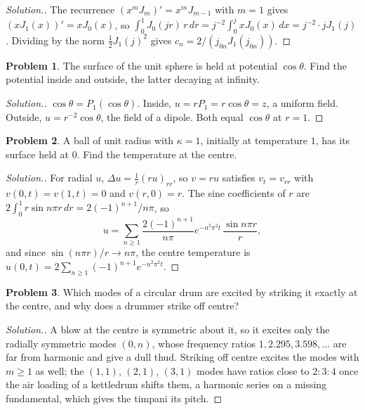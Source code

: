 \documentclass[11pt,a4paper]{article}
\numberwithin{equation}{section}
\theoremstyle{definition}
\newtheorem{problemx}{Problem}[subsection]
\newenvironment{problem}{\begin{problemx}}{\end{problemx}}
\newenvironment{solution}
  {\renewcommand{\qedsymbol}{}\begin{proof}[\textit{Solution}.]}
  {\end{proof}}
\begin{document}
\begin{solution}
The recurrence $(x^mJ_m)' = x^mJ_{m - 1}$ with $m = 1$ gives $(xJ_1(x))' = xJ_0(x)$, so $\int_0^1J_0(jr)\,r\,dr = j^{-2}\int_0^jxJ_0(x)\,dx = j^{-2}\cdot jJ_1(j)$. Dividing by the norm $\frac12J_1(j)^2$ gives $c_n = 2/(j_{0n}J_1(j_{0n}))$.
\end{solution}

\begin{problem}
The surface of the unit sphere is held at potential $\cos\theta$. Find the potential inside and outside, the latter decaying at infinity.
\end{problem}

\begin{solution}
$\cos\theta = P_1(\cos\theta)$. Inside, $u = rP_1 = r\cos\theta = z$, a uniform field. Outside, $u = r^{-2}\cos\theta$, the field of a dipole. Both equal $\cos\theta$ at $r = 1$.
\end{solution}

\begin{problem}
\label{prob:ball}
A ball of unit radius with $\kappa = 1$, initially at temperature $1$, has its surface held at $0$. Find the temperature at the centre.
\end{problem}

\begin{solution}
For radial $u$, $\Delta u = \frac1r(ru)_{rr}$, so $v = ru$ satisfies $v_t = v_{rr}$ with $v(0, t) = v(1, t) = 0$ and $v(r, 0) = r$. The sine coefficients of $r$ are $2\int_0^1r\sin n\pi r\,dr = 2(-1)^{n + 1}/n\pi$, so
\[
u = \sum_{n \geq 1}\frac{2(-1)^{n + 1}}{n\pi}e^{-n^2\pi^2t}\,\frac{\sin n\pi r}r ,
\]
and since $\sin(n\pi r)/r \to n\pi$, the centre temperature is $u(0, t) = 2\sum_{n \geq 1}(-1)^{n + 1}e^{-n^2\pi^2t}$.
\end{solution}

\begin{problem}
Which modes of a circular drum are excited by striking it exactly at the centre, and why does a drummer strike off centre?
\end{problem}

\begin{solution}
A blow at the centre is symmetric about it, so it excites only the radially symmetric modes $(0, n)$, whose frequency ratios $1, 2.295, 3.598, \ldots$ are far from harmonic and give a dull thud. Striking off centre excites the modes with $m \geq 1$ as well; the $(1, 1)$, $(2, 1)$, $(3, 1)$ modes have ratios
close to $2 : 3 : 4$ once the air loading of a kettledrum shifts them, a harmonic series on a missing fundamental, which gives the timpani its pitch.
\end{solution}
\end{document}
